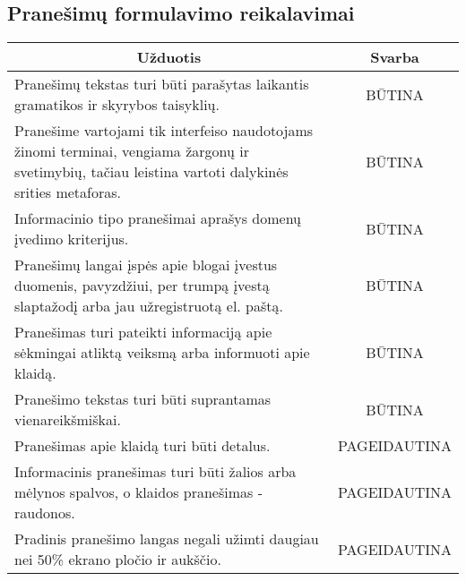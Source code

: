 \documentclass{VUMIFPSkursinis}
\begin{document}
\subsection{Pranešimų formulavimo reikalavimai}
\begin{center}
	\begin{table}[H]
	\begin{tabular}{|p{16cm}|p{2cm}|}
	\hline
		\multicolumn{1}{|c|}{ {\bfseries Užduotis}}&
		\multicolumn{1}{|c|}{{\bfseries Svarba}}\\		
	\hline
	
		\multicolumn{1}{|p{14,5cm}|}{Pranešimų tekstas turi būti parašytas laikantis gramatikos ir skyrybos taisyklių.}& 
		\multicolumn{1}{|c|}{BŪTINA}\\
	\hline
	
		\multicolumn{1}{|p{14,5cm}|}{Pranešime vartojami tik interfeiso naudotojams žinomi terminai, vengiama žargonų ir svetimybių, tačiau leistina vartoti dalykinės srities metaforas.}& 
		\multicolumn{1}{|c|}{BŪTINA}\\
	\hline
	
		\multicolumn{1}{|p{14,5cm}|}{Informacinio tipo pranešimai aprašys domenų įvedimo kriterijus.}& 
		\multicolumn{1}{|c|}{BŪTINA}\\
	\hline
	
		\multicolumn{1}{|p{14,5cm}|}{Pranešimų langai įspės apie blogai įvestus duomenis, pavyzdžiui, per trumpą įvestą slaptažodį arba jau užregistruotą el. paštą.}& 
		\multicolumn{1}{|c|}{BŪTINA}\\
	\hline
	
		\multicolumn{1}{|p{14,5cm}|}{Pranešimas turi pateikti informaciją apie sėkmingai atliktą veiksmą arba informuoti apie klaidą.}& 
		\multicolumn{1}{|c|}{BŪTINA}\\
	\hline
	
		\multicolumn{1}{|p{14,5cm}|}{Pranešimo tekstas turi būti suprantamas vienareikšmiškai.}& 
		\multicolumn{1}{|c|}{BŪTINA}\\
	\hline
	
		\multicolumn{1}{|p{14,5cm}|}{Pranešimas apie klaidą turi būti detalus.}& 
		\multicolumn{1}{|p{1.5cm}|}{PAGEIDAUTINA}\\
	\hline
	
		\multicolumn{1}{|p{14,5cm}|}{Informacinis pranešimas turi būti žalios arba mėlynos spalvos, o klaidos pranešimas - raudonos.}& 
		\multicolumn{1}{|p{1.5cm}|}{PAGEIDAUTINA}\\
	\hline
	
		\multicolumn{1}{|p{14,5cm}|}{Pradinis pranešimo langas negali užimti daugiau nei 50\% ekrano pločio ir aukščio.}& 
		\multicolumn{1}{|p{1.5cm}|}{PAGEIDAUTINA}\\
	\hline
	

\end{tabular}
\end{table}
\end{center}
\end{document}
